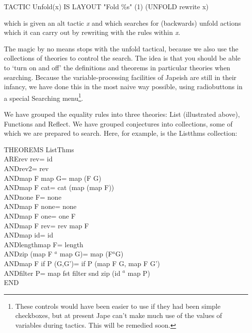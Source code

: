 TACTIC Unfold(x) IS LAYOUT "Fold \%s" (1) (UNFOLD rewrite x)


which is given an alt tactic \textit{x} and which searches for (backwards) unfold actions which it can carry out by rewriting with the rules within \textit{x}.


The magic by no means stops with the unfold tactical, because we also use the collections of theories to control the search. The idea is that you should be able to `turn on and off' the definitions and theorems in particular theories when searching. Because the variable-processing facilities of Japeish are still in their infancy, we have done this in the most naive way possible, using radiobuttons in a special Searching menu\footnote{These controls would have been easier to use if they had been simple checkboxes, but at present Jape can't make much use of the values of variables during tactics. This will be remedied soon.}.


We have grouped the equality rules into three theories: List (illustrated above), Functions and Reflect. We have grouped conjectures into collections, some of which we are prepared to search. Here, for example, is the Listthms collection:

THEOREMS ListThms\\
ARE\tab rev {\textbullet} rev\tab = id\\
AND\tab rev2\tab  = rev\\
AND\tab map F {\textbullet} map G\tab = map (F {\textbullet} G)\\
AND\tab map F {\textbullet} cat\tab = cat {\textbullet} (map (map F))\\
AND\tab none {\textbullet} F\tab = none\\
AND\tab map F {\textbullet} none\tab = none\\
AND\tab map F {\textbullet} one\tab = one {\textbullet} F\\
AND\tab map F {\textbullet} rev\tab = rev {\textbullet} map F\\
AND\tab map id\tab = id\\
AND\tab length{\textbullet}map F\tab = length\\
AND\tab zip {\textbullet} (map F \ensuremath{^a} map G)\tab = map (F\ensuremath{^a}G)\\
AND\tab map F {\textbullet} if P (G,G')\tab = if P (map F {\textbullet} G, map F {\textbullet} G')\\
AND\tab filter P\tab = map fst {\textbullet} filter snd {\textbullet} zip {\textbullet} (id \ensuremath{^a} map P)\\
END



